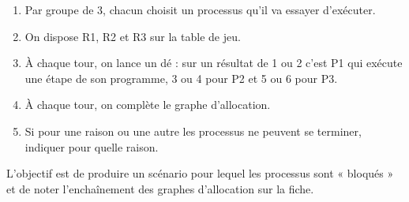 \documentclass[a4paper,10pt,french]{book}
\begin{document}
\begin{enumerate}[\bfseries a.]
	\item Par groupe de 3, chacun choisit un processus qu'il va essayer d'exécuter.
	\item On dispose R1, R2 et R3 sur la table de jeu.
	\item À chaque tour, on lance un dé : sur un résultat de 1 ou 2 c'est P1 qui exécute une étape de son programme, 3 ou 4 pour P2 et 5 ou 6 pour P3.\\
	\item À chaque tour, on complète le graphe d'allocation.
	\item  Si pour une raison ou une autre les processus ne peuvent se terminer, indiquer pour quelle raison.
\end{enumerate}

L'objectif est de produire un scénario pour lequel les processus sont « bloqués » et de noter l'enchaînement des graphes d'allocation sur la fiche.
\end{document}
